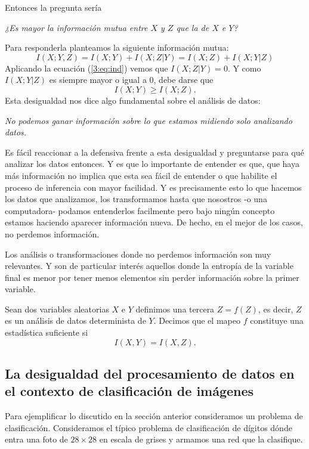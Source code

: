 Entonces la pregunta ser\'ia
\begin{center}
    {\it ¿Es mayor la informaci\'on mutua entre $X$ y $Z$ que la de $X$ e $Y$?}
\end{center}
Para responderla planteamos la siguiente informaci\'on mutua:
\begin{equation}
    I(X;Y,Z) = I(X;Y) + I(X;Z|Y) = I(X;Z) + I(X;Y|Z) 
\end{equation}
Aplicando la ecuaci\'on (\ref{3:eq:ind}) vemos que $I(X;Z|Y)=0$. Y como $I(X;Y|Z)$ es siempre mayor o igual a 0, debe darse que
\begin{equation}
    I(X;Y) \geq I(X;Z).
\end{equation}
Esta desigualdad nos dice algo fundamental sobre el an\'alisis de datos:
\begin{center}
    {\it
    No podemos ganar informaci\'on sobre lo que estamos midiendo solo analizando datos.
    }
\end{center}
Es f\'acil reaccionar a la defensiva frente a esta desigualdad y preguntarse para qu\'e analizar los datos entonces. Y es que lo importante de entender es que, que haya m\'as informaci\'on no implica que esta sea f\'acil de entender o que habilite el proceso de inferencia con mayor facilidad. Y es precisamente esto lo que hacemos los datos que analizamos, los transformamos hasta que nosostros -o una computadora- podamos entenderlos facilmente pero bajo ning\'un concepto estamos haciendo aparecer informaci\'on nueva. De hecho, en el mejor de los casos, no perdemos informaci\'on.

Los an\'alisis o transformaciones donde no perdemos informaci\'on son muy relevantes. Y son de particular inter\'es aquellos donde la entrop\'ia de la variable final es menor por tener menos elementos sin perder informaci\'on sobre la primer variable.
\begin{definition}
    Sean dos variables aleatorias $X$ e $Y$ definimos una tercera $Z=f(Z)$, es decir, $Z$ es un an\'alisis de datos determinista de $Y$. Decimos que el mapeo $f$ constituye una estad\'istica suficiente si
    \begin{equation}
        I(X,Y) = I(X,Z).
    \end{equation}
\end{definition}
\subsection{La desigualdad del procesamiento de datos en el contexto de clasificaci\'on de im\'agenes}
Para ejemplificar lo discutido en la secci\'on anterior consideramos un problema de clasificaci\'on. Consideramos el t\'ipico problema de clasificaci\'on de d\'igitos d\'onde entra una foto de $28\times 28$ en escala de grises y armamos una red que la clasifique. 

